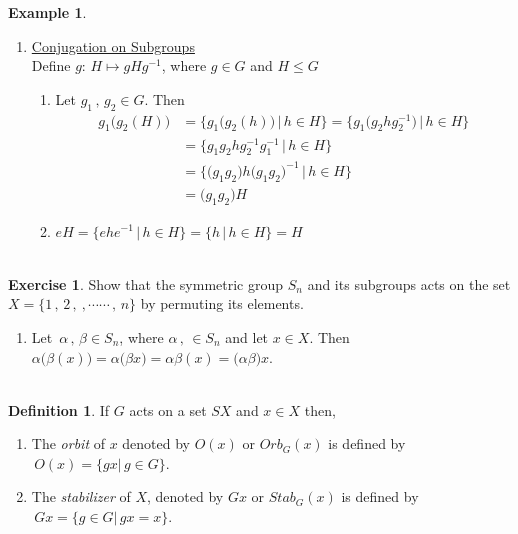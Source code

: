 \documentclass[11pt,a4paper]{article}
\theoremstyle{definition}
\newtheorem{defn}[thm]{Definition}
\newtheorem{exa}[thm]{Example}
\newtheorem{exe}[thm]{Exercise}
\begin{document}
\begin{exa}
\begin{enumerate}
\item \underline{Conjugation on Subgroups}\\
Define $g:\, H\longmapsto gHg^{-1}$, where $g\in G$ and $H\leq G$
\begin{enumerate}
        \item[(i)] Let $g_1\, , \, g_2 \in G$. Then 
        \begin{align*}
        g_1\big(g_2(H)\big) & = \big\{g_1\big(g_2(h)\big)\, \big|\, h\in H\big\} = \big\{g_1\big(g_2hg_2^{-1}\big)\, \big|\, h\in H\big\}\\
                            & = \big\{g_1g_2hg_2^{-1}g_1^{-1}\,\big|\, h\in H\big\}\\
                            & = \big\{\big(g_1g_2\big)h\big(g_1g_2\big)^{-1}\, \big|\, h\in H\big\}\\
                            & = \big(g_1g_2\big)H
        \end{align*}
        
        \item[(ii)] $eH = \big\{ehe^{-1}\, \big|\, h\in H\big\} = \big\{h\, \big|\, h\in H\big\} = H$\\\\
\end{enumerate}
\end{enumerate}
\end{exa}



\begin{exe}
Show that the symmetric group $S_n$ and its subgroups acts on the set $X = \{1\, , \, 2\, , \ , \cdots\cdots\, , \, n\}$ by permuting its elements.
\begin{enumerate}
\item[(i)] Let $\, \alpha\, ,\, \beta\in S_n$, where $\alpha\,,\, \in S_n$ and let $x\in X$. Then $\alpha\big(\beta (x)\big) = \alpha\big(\beta x\big) = \alpha \beta (x) = \big(\alpha\beta\big) x$.\\\\
\end{enumerate}
\end{exe}










\begin{defn}
If $G$ acts on a set $SX$ and $x\in X$ then,
\begin{enumerate}
\item[(i)] The \textit{orbit} of $x$ denoted by $O(x)$ or $Orb_G(x)$ is defined by $\, O(x) = \{gx|\, g\in G\}$.
\item[(ii)] The \textit{stabilizer} of $X$, denoted by $Gx$ or $Stab_G(x)$ is defined by $\, Gx = \{g\in G|\, gx = x\}$.\\\\
\end{enumerate}
\end{defn}
\end{document}

